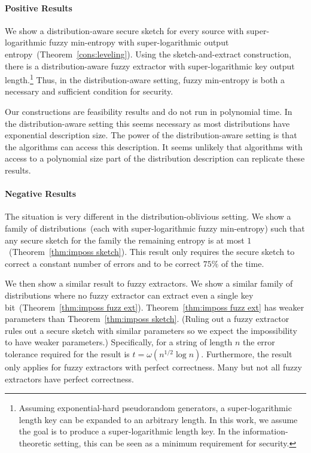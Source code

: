 \documentclass[11pt]{article}
\newcommand{\thref}[1]{\mbox{Theorem~\ref{#1}}}
\begin{document}

\paragraph{Positive Results} %
We show a distribution-aware secure sketch for every source with super-logarithmic fuzzy min-entropy with super-logarithmic output entropy~(\thref{cons:leveling}).  Using the sketch-and-extract construction, there is a distribution-aware fuzzy extractor with super-logarithmic key output length.\footnote{Assuming exponential-hard pseudorandom generators, a super-logarithmic length key can be expanded to an arbitrary length.  In this work, we assume the goal is to produce a super-logarithmic length key.  In the information-theoretic setting, this can be seen as a minimum requirement for security.}  Thus, in the distribution-aware setting, fuzzy min-entropy is both a necessary and sufficient condition for security.  

Our constructions are feasibility results and do not run in polynomial time.  In the distribution-aware setting this seems necessary as most distributions have exponential description size.  The power of the distribution-aware setting is that the algorithms can access this description.  It seems unlikely that algorithms with access to a polynomial size part of the distribution description can replicate these results.

\paragraph{Negative Results}
The situation is very different in the distribution-oblivious setting.  We show a family of distributions~(each with super-logarithmic fuzzy min-entropy) such that any secure sketch for the family the remaining entropy is at most $1$~(\thref{thm:imposs sketch}).  This result only requires the secure sketch to correct a constant number of errors and to be correct $75\%$ of the time.  

We then show a similar result to fuzzy extractors.  We show a similar family of distributions where no fuzzy extractor can extract even a single key bit~(\thref{thm:imposs fuzz ext}).  \thref{thm:imposs fuzz ext} has weaker parameters than \thref{thm:imposs sketch}.  (Ruling out a fuzzy extractor rules out a secure sketch with similar parameters so we expect the impossibility to have weaker parameters.)  Specifically, for a string of length $n$ the error tolerance required for the result is $t=\omega(n^{1/2}\log n)$.  Furthermore, the result only applies for fuzzy extractors with perfect correctness.  Many but not all fuzzy extractors have perfect correctness.
\end{document}
